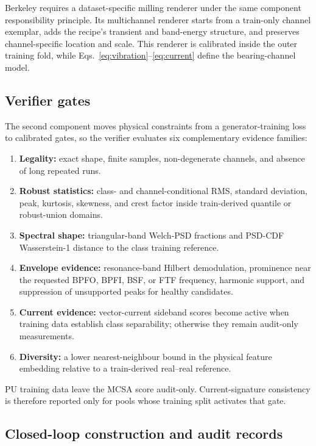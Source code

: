 \documentclass[a4paper,fleqn]{cas-sc}
\begin{document}
Berkeley requires a dataset-specific milling renderer under the same component
responsibility principle. Its multichannel renderer starts from a train-only
channel exemplar, adds the recipe's transient and band-energy structure, and
preserves channel-specific location and scale. This renderer is calibrated
inside the outer training fold, while
Eqs.~\eqref{eq:vibration}--\eqref{eq:current} define the bearing-channel model.

\subsection{Verifier gates}

The second component moves physical constraints from a generator-training loss
to calibrated gates, so the verifier evaluates six complementary evidence
families:
\begin{enumerate}
  \item \textbf{Legality:} exact shape, finite samples, non-degenerate
  channels, and absence of long repeated runs.
  \item \textbf{Robust statistics:} class- and channel-conditional RMS,
  standard deviation, peak, kurtosis, skewness, and crest factor inside
  train-derived quantile or robust-union domains.
  \item \textbf{Spectral shape:} triangular-band Welch-PSD fractions and
  PSD-CDF Wasserstein-1 distance to the class training reference.
  \item \textbf{Envelope evidence:} resonance-band Hilbert demodulation,
  prominence near the requested BPFO, BPFI, BSF, or FTF frequency, harmonic support,
  and suppression of unsupported peaks for healthy candidates.
  \item \textbf{Current evidence:} vector-current sideband scores become active
  when training data establish class separability; otherwise they remain
  audit-only measurements.
  \item \textbf{Diversity:} a lower nearest-neighbour bound in the physical
  feature embedding relative to a train-derived real--real reference.
\end{enumerate}
PU training data leave the MCSA score audit-only. Current-signature consistency
is therefore reported only for pools whose training split activates that gate.

\subsection{Closed-loop construction and audit records}
\end{document}
